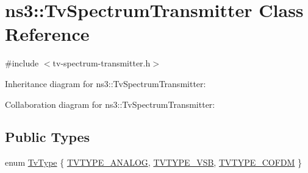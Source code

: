 \hypertarget{classns3_1_1TvSpectrumTransmitter}{}\section{ns3\+:\+:Tv\+Spectrum\+Transmitter Class Reference}
\label{classns3_1_1TvSpectrumTransmitter}


{\ttfamily \#include $<$tv-\/spectrum-\/transmitter.\+h$>$}



Inheritance diagram for ns3\+:\+:Tv\+Spectrum\+Transmitter\+:


Collaboration diagram for ns3\+:\+:Tv\+Spectrum\+Transmitter\+:
\subsection*{Public Types}
\begin{DoxyCompactItemize}
\item 
enum \hyperlink{classns3_1_1TvSpectrumTransmitter_a9ec4fd6860d2d287b1304397b425f0d8}{Tv\+Type} \{ \hyperlink{classns3_1_1TvSpectrumTransmitter_a9ec4fd6860d2d287b1304397b425f0d8aca916f93508d6edae3c6bd5af2afcdc4}{T\+V\+T\+Y\+P\+E\+\_\+\+A\+N\+A\+L\+OG}, 
\hyperlink{classns3_1_1TvSpectrumTransmitter_a9ec4fd6860d2d287b1304397b425f0d8aeca316e65358d933299c96fbab39a325}{T\+V\+T\+Y\+P\+E\+\_\+V\+SB}, 
\hyperlink{classns3_1_1TvSpectrumTransmitter_a9ec4fd6860d2d287b1304397b425f0d8a6afcc538d373d5f28efbf4c9458393b2}{T\+V\+T\+Y\+P\+E\+\_\+\+C\+O\+F\+DM}
 \}
\end{DoxyCompactItemize}
